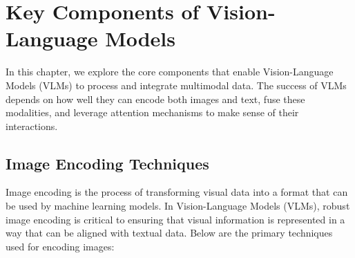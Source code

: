 \chapter{Key Components of Vision-Language Models}




In this chapter, we explore the core components that enable Vision-Language Models (VLMs) to process and integrate multimodal data. The success of VLMs depends on how well they can encode both images and text, fuse these modalities, and leverage attention mechanisms to make sense of their interactions.

\section{Image Encoding Techniques}

Image encoding is the process of transforming visual data into a format that can be used by machine learning models. In Vision-Language Models (VLMs), robust image encoding is critical to ensuring that visual information is represented in a way that can be aligned with textual data. Below are the primary techniques used for encoding images:


